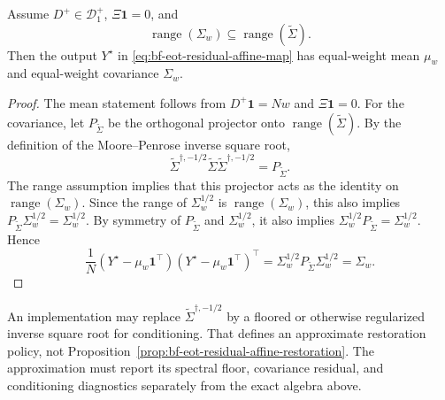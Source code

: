 \begin{proposition}
\label{prop:bf-eot-residual-affine-restoration}
Assume \(D^+\in\mathcal D_1^+\), \(\Xi\mathbf 1=0\), and
\[
  \operatorname{range}(\Sigma_w)
  \subseteq
  \operatorname{range}(\widetilde\Sigma).
\]
Then the output \(Y^\star\) in \eqref{eq:bf-eot-residual-affine-map} has
equal-weight mean \(\mu_w\) and equal-weight covariance \(\Sigma_w\).
\end{proposition}

\begin{proof}
The mean statement follows from \(D^+\mathbf 1=Nw\) and \(\Xi\mathbf 1=0\).
For the covariance, let \(P_{\widetilde\Sigma}\) be the orthogonal projector
onto \(\operatorname{range}(\widetilde\Sigma)\).  By the definition of the
Moore--Penrose inverse square root,
\[
  \widetilde\Sigma^{\dagger,-1/2}
  \widetilde\Sigma
  \widetilde\Sigma^{\dagger,-1/2}
  =
  P_{\widetilde\Sigma}.
\]
The range assumption implies that this projector acts as the identity on
\(\operatorname{range}(\Sigma_w)\).  Since the range of
\(\Sigma_w^{1/2}\) is \(\operatorname{range}(\Sigma_w)\), this also implies
\(P_{\widetilde\Sigma}\Sigma_w^{1/2}=\Sigma_w^{1/2}\).  By symmetry of
\(P_{\widetilde\Sigma}\) and \(\Sigma_w^{1/2}\), it also implies
\(\Sigma_w^{1/2}P_{\widetilde\Sigma}=\Sigma_w^{1/2}\).  Hence
\[
  \frac1N
  (Y^\star-\mu_w\mathbf 1^\top)
  (Y^\star-\mu_w\mathbf 1^\top)^\top
  =
  \Sigma_w^{1/2}
  P_{\widetilde\Sigma}
  \Sigma_w^{1/2}
  =
  \Sigma_w .
\]
\end{proof}

An implementation may replace \(\widetilde\Sigma^{\dagger,-1/2}\) by a floored
or otherwise regularized inverse square root for conditioning.  That defines an
approximate restoration policy, not Proposition~\ref{prop:bf-eot-residual-affine-restoration}.
The approximation must report its spectral floor, covariance residual, and
conditioning diagnostics separately from the exact algebra above.

